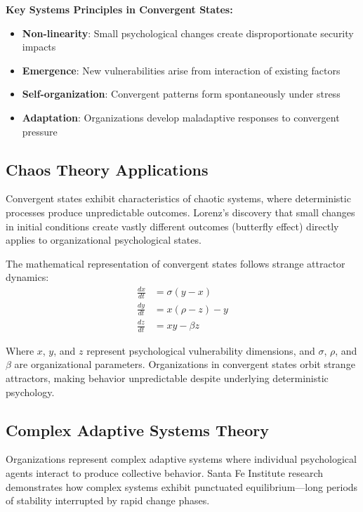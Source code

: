 \documentclass[11pt,a4paper]{article}
\begin{document}
\textbf{Key Systems Principles in Convergent States:}
\begin{itemize}
\item \textbf{Non-linearity}: Small psychological changes create disproportionate security impacts
\item \textbf{Emergence}: New vulnerabilities arise from interaction of existing factors
\item \textbf{Self-organization}: Convergent patterns form spontaneously under stress
\item \textbf{Adaptation}: Organizations develop maladaptive responses to convergent pressure
\end{itemize}

\subsection{Chaos Theory Applications}

Convergent states exhibit characteristics of chaotic systems, where deterministic processes produce unpredictable outcomes. Lorenz's\cite{lorenz1963} discovery that small changes in initial conditions create vastly different outcomes (butterfly effect) directly applies to organizational psychological states.

The mathematical representation of convergent states follows strange attractor dynamics:
\begin{align}
\frac{dx}{dt} &= \sigma(y - x) \\
\frac{dy}{dt} &= x(\rho - z) - y \\
\frac{dz}{dt} &= xy - \beta z
\end{align}

Where $x$, $y$, and $z$ represent psychological vulnerability dimensions, and $\sigma$, $\rho$, and $\beta$ are organizational parameters. Organizations in convergent states orbit strange attractors, making behavior unpredictable despite underlying deterministic psychology.

\subsection{Complex Adaptive Systems Theory}

Organizations represent complex adaptive systems where individual psychological agents interact to produce collective behavior. Santa Fe Institute research\cite{arthur1997} demonstrates how complex systems exhibit punctuated equilibrium—long periods of stability interrupted by rapid change phases.
\end{document}
